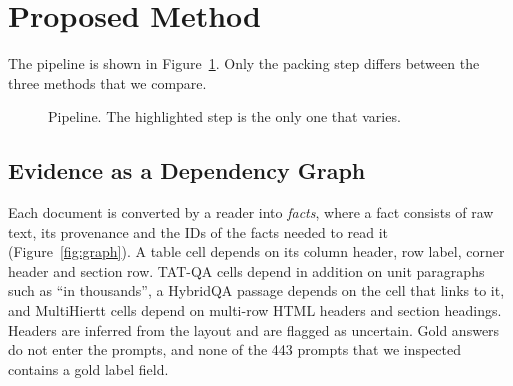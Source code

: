 \documentclass[11pt]{article}
\begin{document}
\section{Proposed Method}
\label{sec:method}
The pipeline is shown in Figure~\ref{fig:pipeline}. Only the packing step differs
between the three methods that we compare.

\begin{figure}[t]
\centering
{}
\caption{Pipeline. The highlighted step is the only one that varies.}
\label{fig:pipeline}
\end{figure}

\subsection{Evidence as a Dependency Graph}
Each document is converted by a reader into \emph{facts}, where a fact consists of raw
text, its provenance and the IDs of the facts needed to read it (Figure~\ref{fig:graph}).
A table cell depends on its column header, row label, corner header and section row.
TAT-QA cells depend in addition on unit paragraphs such as ``in thousands'', a HybridQA
passage depends on the cell that links to it, and MultiHiertt cells depend on multi-row
HTML headers and section headings. Headers are inferred from the layout and are flagged
as uncertain. Gold answers do not enter the prompts, and none of the 443 prompts that
we inspected contains a gold label field.
\end{document}
